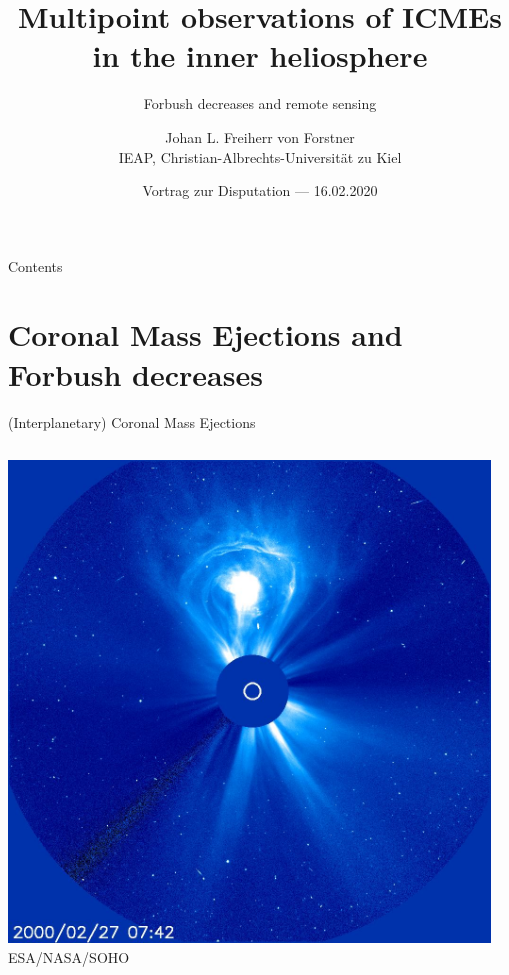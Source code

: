 \documentclass[10pt,aspectratio=169,usenames,dvipsnames]{beamer}
\title{Multipoint observations of ICMEs in the inner heliosphere}
\subtitle{Forbush decreases and remote sensing}
\author{Johan L. Freiherr von Forstner\\IEAP, Christian-Albrechts-Universität zu Kiel}
\date{Vortrag zur Disputation --- 16.02.2020}
\begin{document}
\maketitle

\begin{frame}{Contents}
    \tableofcontents
\end{frame}

\section{Coronal Mass Ejections and Forbush decreases}

\begin{frame}{(Interplanetary) Coronal Mass Ejections}
    \begin{columns}
        \begin{column}{0.45\textwidth}
            \centering
            \includegraphics[width=\textwidth]{images/20000227_0742_c3_1024.jpg}\\
            \scriptsize ESA/NASA/SOHO
        \end{column}
        \begin{column}{0.45\textwidth}
        	\centering
            \vskip2mm

\end{column}
\end{columns}
\end{frame}
\end{document}
